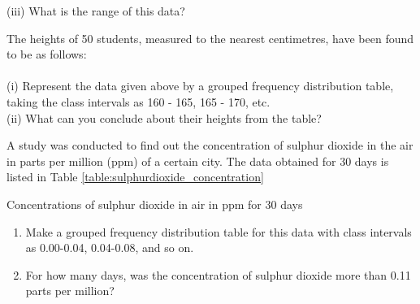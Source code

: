 (iii) What is the range of this data?\\
\item The heights of 50 students, measured to the nearest centimetres, have been found to be as follows:\\
\\

(i) Represent the data given above by a grouped frequency distribution table, taking the class intervals as 160 - 165, 165 - 170, etc.\\
(ii) What can you conclude about their heights from the table?\\
\item 
A study was conducted to find out the concentration of sulphur dioxide in the air in parts per million (ppm) of a certain city. The data obtained for 30 days is listed in Table \ref{table:sulphurdioxide_concentration}

\begin{table}[ht!]
\centering

\caption{Concentrations of sulphur dioxide in air in ppm for 30 days}
\label{table:sulphurdioxide_concentration}
\end{table}
\begin{enumerate}
\item Make a grouped frequency distribution table for this data with class intervals as 0.00-0.04, 0.04-0.08, and so on.
\item  For how many days, was the concentration of sulphur dioxide more than 0.11 parts per million?
\end{enumerate}
\solution

\item 

\solution

\item 

\solution

\item 

\solution



